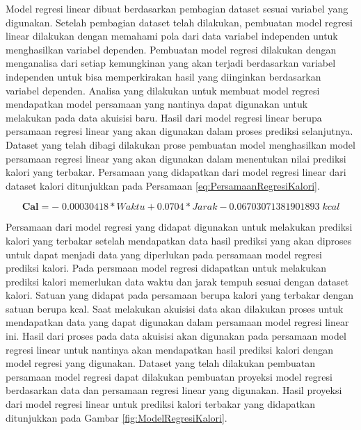 Model regresi linear dibuat berdasarkan pembagian dataset sesuai variabel yang digunakan. Setelah pembagian dataset telah dilakukan, pembuatan model regresi linear dilakukan dengan memahami pola dari data variabel independen untuk menghasilkan variabel dependen. Pembuatan model regresi dilakukan dengan menganalisa dari setiap kemungkinan yang akan terjadi berdasarkan variabel independen untuk bisa memperkirakan hasil yang diinginkan berdasarkan variabel dependen. Analisa yang dilakukan untuk membuat model regresi mendapatkan model persamaan yang nantinya dapat digunakan untuk melakukan pada data akuisisi baru. Hasil dari model regresi linear berupa persamaan regresi linear yang akan digunakan dalam proses prediksi selanjutnya. Dataset yang telah dibagi dilakukan prose pembuatan model menghasilkan model persamaan regresi linear yang akan digunakan dalam menentukan nilai prediksi kalori yang terbakar. Persamaan yang didapatkan dari model regresi linear dari dataset kalori ditunjukkan pada Persamaan \ref{eq:PersamaanRegresiKalori}.

\begin{equation}
  \label{eq:PersamaanRegresiKalori}
  \mathbf{Cal} = - \; 0.00030418*Waktu + 0.0704*Jarak - 0.06703071381901893 \; kcal
\end{equation}

Persamaan dari model regresi yang didapat digunakan untuk melakukan prediksi kalori yang terbakar setelah mendapatkan data hasil prediksi yang akan diproses untuk dapat menjadi data yang diperlukan pada persamaan model regresi prediksi kalori. Pada persmaan model regresi didapatkan untuk melakukan prediksi kalori memerlukan data waktu dan jarak tempuh sesuai dengan dataset kalori. Satuan yang didapat pada persamaan berupa kalori yang terbakar dengan satuan berupa kcal. Saat melakukan akuisisi data akan dilakukan proses untuk mendapatkan data yang dapat digunakan dalam persamaan model regresi linear ini. Hasil dari proses pada data akuisisi akan digunakan pada persamaan model regresi linear untuk nantinya akan mendapatkan hasil prediksi kalori dengan model regresi yang digunakan. Dataset yang telah dilakukan pembuatan persamaan model regresi dapat dilakukan pembuatan proyeksi model regresi berdasarkan data dan persamaan regresi linear yang digunakan. Hasil proyeksi dari model regresi linear untuk prediksi kalori terbakar yang didapatkan ditunjukkan pada Gambar \ref{fig:ModelRegresiKalori}.

